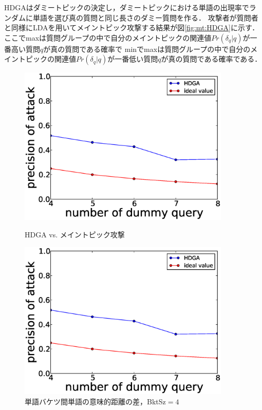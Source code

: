 \documentclass[master]{suribt}
\theoremstyle{definition}
\begin{document}
 HDGAはダミートピックの決定し，ダミートピックにおける単語の出現率でランダムに単語を選び真の質問と同じ長さのダミー質問を作る．
 攻撃者が質問者と同様にLDAを用いてメイントピック攻撃する結果が図\ref{fig:mt:HDGA}に示す．
 ここでmaxは質問グループの中で自分のメイントピックの関連値$Pr(\delta_q|q)$が一番高い質問$q$が真の質問である確率で
 minでmaxは質問グループの中で自分のメイントピックの関連値$Pr(\delta_q|q)$が一番低い質問$q$が真の質問である確率である．
 
 \begin{figure}
 \begin{minipage}[t]{0.5\linewidth}
 \centering
 \includegraphics[width=0.9\textwidth]{HMD.eps}
 \vspace{5em}
 \caption{HDGA vs. メイントピック攻撃}
 \label{fig:mt:HDGA}
 \end{minipage}%
 \begin{minipage}[t]{0.5\linewidth}
 \centering
 \includegraphics[width=0.9\textwidth]{HMD.eps}
 \vspace{5em}
 \caption{単語バケツ間単語の意味的距離の差，BktSz$=4$}
 \label{fig:r2}
 \end{minipage}
 \end{figure}
\end{document}
